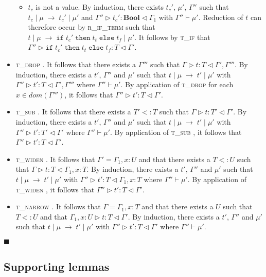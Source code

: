 \documentclass[preprint]{sigplanconf}
\newcommand{\rifexpr}{\textsc{r\_if\_term} }
\newcommand{\tif}{\textsc{t\_if} }
\newcommand{\tdrop}{\textsc{t\_drop} }
\newcommand{\tsub}{\textsc{t\_sub} }
\newcommand{\tnarrow}{\textsc{t\_narrow} }
\newcommand{\twiden}{\textsc{t\_widen} }
\newcommand{\typerule}[4]{#1 \triangleright #2 : #3 \triangleleft #4}
\newcommand{\oprule}[4]{#1 \mid #2\;\longrightarrow\;#3 \mid #4}
\newcommand{\boolt}{\mathbf{Bool}}
\newcommand{\ift}[3]{\mathtt{if} \; #1 \; \mathtt{then} \; #2 \; \mathtt{else} \; #3}
\newcommand{\qed}{$\blacksquare$}
\newenvironment{proof}{\vspace{1ex}\noindent{\bf Proof}\hspace{0.5em}}
  {\hfill\qed\vspace{1ex}}
\begin{document}
\begin{proof}
\begin{itemize}
\begin{itemize}
  \item $t_c$ is not a value. By induction, there exists $t_c'$,
  $\mu'$, $\Gamma''$ such that 
  $\oprule{t_c}{\mu}{t_c'}{\mu'}$ and 
  $\typerule{\Gamma''}{t_c'}{\boolt}{\Gamma_1}$ with $\Gamma'' \vdash \mu'$. 
  Reduction of $t$ can therefore occur by \rifexpr such that
  $\oprule{t}{\mu}{\ift{t_c'}{t_t}{t_f}}{\mu'}$. It follows
  by \tif that $\typerule{\Gamma''}{\ift{t_c'}{t_t}{t_f}}{T}{\Gamma'}$.
  \end{itemize}

\item \tdrop. It follows that there exists a $\Gamma'''$ such that
$\typerule{\Gamma}{t}{T}{\Gamma', \Gamma'''}$. By induction, there exists
a $t'$, $\Gamma''$ and $\mu'$ such that
$\oprule{t}{\mu}{t'}{\mu'}$ with
$\typerule{\Gamma''}{t'}{T}{\Gamma', \Gamma'''}$ where $\Gamma'' \vdash \mu'$.
By application of \tdrop for each $x \in dom(\Gamma''')$, it follows that
$\typerule{\Gamma''}{t'}{T}{\Gamma'}$.

\item \tsub. It follows that there exists a $T' <: T$ such that
$\typerule{\Gamma}{t}{T'}{\Gamma'}$. By induction, there exists a $t'$,
$\Gamma''$ and $\mu'$ such that 
$\oprule{t}{\mu}{t'}{\mu'}$ with
$\typerule{\Gamma''}{t'}{T'}{\Gamma'}$ where
$\Gamma'' \vdash \mu'$. By application of \tsub, it follows that
$\typerule{\Gamma''}{t'}{T}{\Gamma'}$.

\item \twiden. It follows that $\Gamma' = \Gamma_1, x : U$ and that there
exists a $T <: U$ such that $\typerule{\Gamma}{t}{T}{\Gamma_1, x : T}$.
By induction, there exists a $t'$, $\Gamma''$ and $\mu'$ such that
$\oprule{t}{\mu}{t'}{\mu'}$ with $\typerule{\Gamma''}{t'}{T}{\Gamma_1, x : T}$
where $\Gamma'' \vdash \mu'$. By application of \twiden, it follows that
$\typerule{\Gamma''}{t'}{T}{\Gamma'}$.

\item \tnarrow. It follows that $\Gamma = \Gamma_1, x : T$ and that there
exists a $U$ such that $T <: U$ and that $\typerule{\Gamma_1, x : U}{t}{T}{\Gamma'}$.
By induction, there exists a $t'$, $\Gamma''$ and $\mu'$ such that
$\oprule{t}{\mu}{t'}{\mu'}$ with $\typerule{\Gamma''}{t'}{T}{\Gamma'}$ where
$\Gamma'' \vdash \mu'$.

\end{itemize}
\end{proof}

\subsection{Supporting lemmas}
\label{app:proofs}
\end{document}
